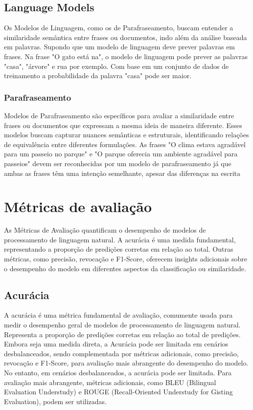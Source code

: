 \subsection{Language Models}
Os Modelos de Linguagem, como os de Parafraseamento, buscam entender a similaridade semântica entre frases ou documentos, indo além da análise baseada em palavras. Supondo que um modelo de linguagem deve prever palavras em frases. Na frase "O gato está na", o modelo de linguagem pode prever as palavras "casa", "árvore" e rua por exemplo. Com base em um conjunto de dados de treinamento a probabilidade da palavra "casa" pode ser maior.

\subsubsection{Parafraseamento}
Modelos de Parafraseamento são específicos para avaliar a similaridade entre frases ou documentos que expressam a mesma ideia de maneira diferente. Esses modelos buscam capturar nuances semânticas e estruturais, identificando relações de equivalência entre diferentes formulações. As frases "O clima estava agradável para um passeio no parque" e "O parque oferecia um ambiente agradável para passeios" devem ser reconhecidas por um modelo de parafraseamento já que ambas as frases têm uma intenção semelhante, apesar das diferenças na escrita

\section{Métricas de avaliação}
As Métricas de Avaliação quantificam o desempenho de modelos de processamento de linguagem natural. A acurácia é uma medida fundamental, representando a proporção de predições corretas em relação ao total. Outras métricas, como precisão, revocação e F1-Score, oferecem insights adicionais sobre o desempenho do modelo em diferentes aspectos da classificação ou similaridade.

\subsection{Acurácia}
A acurácia é uma métrica fundamental de avaliação, comumente usada para medir o desempenho geral de modelos de processamento de linguagem natural. Representa a proporção de predições corretas em relação ao total de predições. Embora seja uma medida direta, a Acurácia pode ser limitada em cenários desbalanceados, sendo complementada por métricas adicionais, como precisão, revocação e F1-Score, para avaliação mais abrangente do desempenho do modelo. No entanto, em cenários desbalanceados, a acurácia pode ser limitada. Para avaliação mais abrangente, métricas adicionais, como BLEU (Bilingual Evaluation Understudy) e ROUGE (Recall-Oriented Understudy for Gisting Evaluation), podem ser utilizadas.

